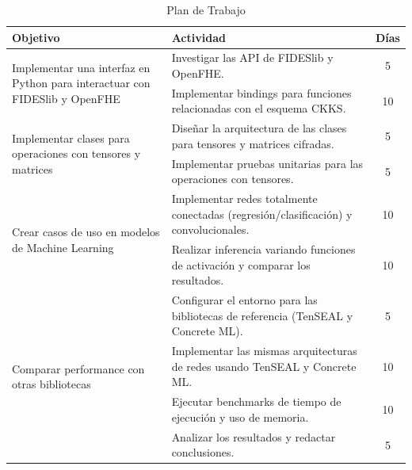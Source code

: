\begin{table}[h]
    \centering
    \begin{tabular}{|p{5.5cm}|p{7cm}|c|}
        \hline
        \textbf{Objetivo} & \textbf{Actividad} & \textbf{Días} \\
        \hline
        \multirow{2}{=}{Implementar una interfaz en Python para interactuar con FIDESlib y OpenFHE}
            & Investigar las API de FIDESlib y OpenFHE. & 5 \\
        \cline{2-3}
            & Implementar bindings para funciones relacionadas con el esquema CKKS. & 10 \\
        \hline
        \multirow{2}{=}{Implementar clases para operaciones con tensores y matrices}
            & Diseñar la arquitectura de las clases para tensores y matrices cifradas. & 5 \\
        \cline{2-3}
            & Implementar pruebas unitarias para las operaciones con tensores. & 5 \\
        \hline
        \multirow{2}{=}{Crear casos de uso en modelos de Machine Learning}
            & Implementar redes totalmente conectadas (regresión/clasificación) y convolucionales. & 10 \\
        \cline{2-3}
            & Realizar inferencia variando funciones de activación y comparar los resultados. & 10 \\
        \hline
        \multirow{4}{=}{Comparar performance con otras bibliotecas}
            & Configurar el entorno para las bibliotecas de referencia (TenSEAL y Concrete ML). & 5 \\
        \cline{2-3}
            & Implementar las mismas arquitecturas de redes usando TenSEAL y Concrete ML. & 10 \\
        \cline{2-3}
            & Ejecutar benchmarks de tiempo de ejecución y uso de memoria. & 10 \\
        \cline{2-3}
            & Analizar los resultados y redactar conclusiones. & 5 \\
        \hline
    \end{tabular}
    \caption{Plan de Trabajo}
    \label{tab:plan_trabajo}
\end{table}
